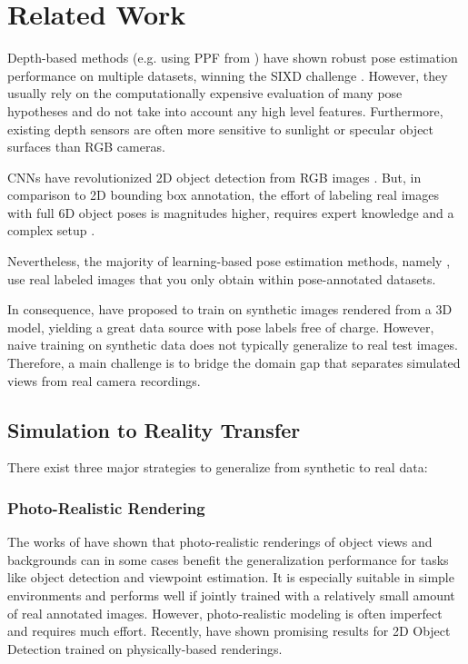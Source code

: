 \section{Related Work\label{sec:relwork}}

Depth-based methods (e.g. using \gls{PPF} from \cite{vidal20186d,hinterstoisser2016going}) have shown robust pose estimation performance on multiple datasets, winning the SIXD challenge \citep{sixd,hodan2018bop}. However, they usually rely on the computationally expensive evaluation of many pose hypotheses and do not take into account any high level features. Furthermore, existing depth sensors are often more sensitive to sunlight or specular object surfaces than RGB cameras.

\glspl{CNN} have revolutionized 2D object detection from RGB images \citep{ren2015faster,liu2016ssd,lin2018focal}. But, in comparison to 2D bounding box annotation, the effort of labeling real images with full 6D object poses is magnitudes higher, requires expert knowledge and a complex setup \citep{hodan2017tless}. 

Nevertheless, the majority of learning-based pose estimation methods, namely \cite{tekin2017real,wohlhart2015learning,brachmann2016uncertainty,rad2017bb8, xiang2017posecnn}, use real labeled images that you only obtain within pose-annotated datasets. 

In consequence, \cite{kehl2017ssd, wohlhart2015learning, tremblay2018deep, zakharov2019dpod} have proposed to train on synthetic images rendered from a 3D model, yielding a great data source with pose labels free of charge. However, naive training on synthetic data does not typically generalize to real test images. Therefore, a main challenge is to bridge the domain gap that separates simulated views from real camera recordings. 

\subsection{Simulation to Reality Transfer}

There exist three major strategies to generalize from synthetic to real data: 

\subsubsection{Photo-Realistic Rendering} The works of \cite{movshovitz2016useful,su2015render,mitash2017self,richter2016playing} have shown that photo-realistic renderings of object views
and backgrounds can in some cases benefit the generalization performance for tasks like object detection and viewpoint estimation. It is especially suitable in simple environments and performs well if jointly trained with a relatively small amount of real annotated images.  However, photo-realistic modeling is often imperfect and requires much effort. Recently, \cite{Hodan2019PhotorealisticIS} have shown promising results for 2D Object Detection trained on physically-based renderings.

